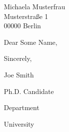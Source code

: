 \documentclass{defaultLetter}
\date{Mo 27.01.2015}
\begin{document}
\begin{letter}{Michaela Musterfrau \\ Musterstraße 1 \\ 00000 Berlin}%

\opening{Dear Some Name,}

\lipsum


\vfill

Sincerely,

\vfill

Joe Smith

Ph.D. Candidate

Department 

University 
\end{letter}
\end{document}
